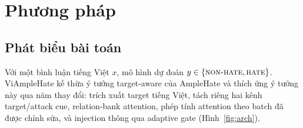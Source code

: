 \documentclass[11pt]{article}
\begin{document}
\section{Phương pháp}

\subsection{Phát biểu bài toán}
Với một bình luận tiếng Việt $x$, mô hình dự đoán $y \in \{\textsc{non-hate}, \textsc{hate}\}$. ViAmpleHate kế thừa ý tưởng target-aware của AmpleHate và thích ứng ý tưởng này qua năm thay đổi: trích xuất target tiếng Việt, tách riêng hai kênh target/attack cue, relation-bank attention, phép tính attention theo batch đã được chỉnh sửa, và injection thông qua adaptive gate (Hình~\ref{fig:arch}).

\end{document}

